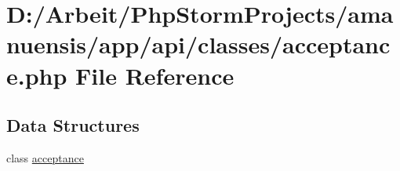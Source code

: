 \hypertarget{a00051}{}\section{D\+:/\+Arbeit/\+Php\+Storm\+Projects/amanuensis/app/api/classes/acceptance.php File Reference}
\label{a00051}
\subsection*{Data Structures}
\begin{DoxyCompactItemize}
\item 
class \hyperlink{a00001}{acceptance}
\end{DoxyCompactItemize}
